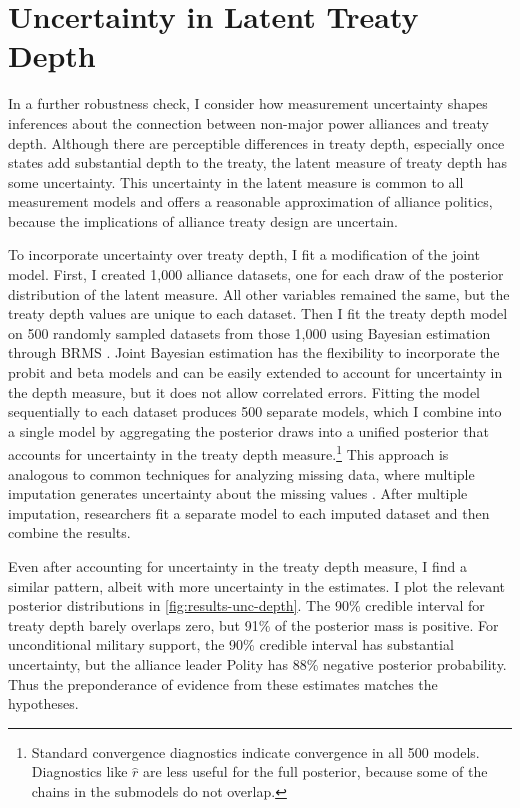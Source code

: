 \documentclass[12pt]{article}
\begin{document}
\section{Uncertainty in Latent Treaty Depth} 


In a further robustness check, I consider how measurement uncertainty shapes inferences about the connection between non-major power alliances and treaty depth. 
Although there are perceptible differences in treaty depth, especially once states add substantial depth to the treaty, the latent measure of treaty depth has some uncertainty. 
This uncertainty in the latent measure is common to all measurement models and offers a reasonable approximation of alliance politics, because the implications of alliance treaty design are uncertain.  


To incorporate uncertainty over treaty depth, I fit a modification of the joint model. 
First, I created 1,000 alliance datasets, one for each draw of the posterior distribution of the latent measure.
All other variables remained the same, but the treaty depth values are unique to each dataset. 
Then I fit the treaty depth model on 500 randomly sampled datasets from those 1,000 using Bayesian estimation through BRMS \citep{Buerkner2017}. 
Joint Bayesian estimation has the flexibility to incorporate the probit and beta models and can be easily extended to account for uncertainty in the depth measure, but it does not allow correlated errors. 
Fitting the model sequentially to each dataset produces 500 separate models, which I combine into a single model by aggregating the posterior draws into a unified posterior that accounts for uncertainty in the treaty depth measure.\footnote{Standard convergence diagnostics indicate convergence in all 500 models. Diagnostics like $\hat{r}$ are less useful for the full posterior, because some of the chains in the submodels do not overlap.}
This approach is analogous to common techniques for analyzing missing data, where multiple imputation generates uncertainty about the missing values \citep{Hollenbachetal2018imp}.
After multiple imputation, researchers fit a separate model to each imputed dataset and then combine the results. 


Even after accounting for uncertainty in the treaty depth measure, I find a similar pattern, albeit with more uncertainty in the estimates. 
I plot the relevant posterior distributions in \autoref{fig:results-unc-depth}. 
The 90\% credible interval for treaty depth barely overlaps zero, but 91\% of the posterior mass is positive. 
For unconditional military support, the 90\% credible interval has substantial uncertainty, but the alliance leader Polity has 88\% negative posterior probability. 
Thus the preponderance of evidence from these estimates matches the hypotheses. 
\end{document}
